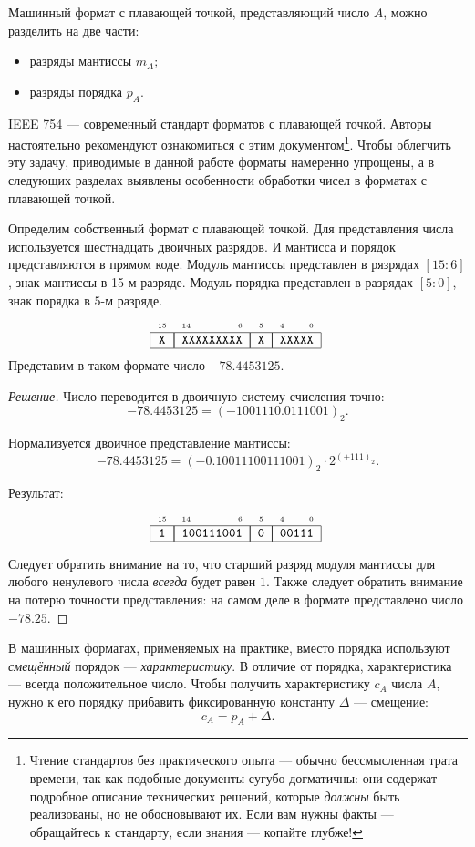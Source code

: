 Машинный формат с плавающей точкой, представляющий число $A$, можно разделить на две части:
\begin{itemize}
    \item разряды мантиссы $m_A$;
    \item разряды порядка $p_A$.
\end{itemize}

IEEE 754 --- современный стандарт форматов с плавающей точкой. Авторы настоятельно рекомендуют ознакомиться с этим документом\footnote{Чтение стандартов без практического опыта --- обычно бессмысленная трата времени, так как подобные документы сугубо догматичны: они содержат подробное описание технических решений, которые \emph{должны} быть реализованы, но не обосновывают их. Если вам нужны факты --- обращайтесь к стандарту, если знания --- копайте глубже!}. Чтобы облегчить эту задачу, приводимые в данной работе форматы намеренно упрощены, а в следующих разделах выявлены особенности обработки чисел в форматах с плавающей точкой.

\begin{Example}
    \label{ch:digitFormat:16order}
    Определим собственный формат с плавающей точкой. Для представления числа используется шестнадцать двоичных разрядов. И мантисса и порядок представляются в прямом коде. Модуль мантиссы представлен в рязрядах $[15:6]$, знак мантиссы в 15-м разряде. Модуль порядка представлен в разрядах $[5:0]$, знак порядка в $5$-м разряде.
    \[
        \FloatMyHex{X}{XXXXXXXXX}{X}{XXXXX}
    \]
    Представим в таком формате число $-78.4453125$.
\end{Example}
\begin{proof}[Решение]
    Число переводится в двоичную систему счисления точно:
    \[-78.4453125 = (-1001110.0111001)_2.\]
    
    Нормализуется двоичное представление мантиссы:
    \[-78.4453125 = (-0.10011100111001)_2\cdot 2^{(+111)_2}.\]
    
    Результат:
    \[
        \FloatMyHex{1}{100111001}{0}{00111}
    \]
    
    Следует обратить внимание на то, что старший разряд модуля мантиссы для любого ненулевого числа \emph{всегда} будет равен $1$. Также следует обратить внимание на потерю точности представления: на самом деле в формате представлено число $-78.25$.
\end{proof}

В машинных форматах, применяемых на практике, вместо порядка используют \emph{смещённый} порядок --- \emph{характеристику}. В отличие от порядка, характеристика --- всегда положительное число. Чтобы получить характеристику $c_A$ числа $A$, нужно к его порядку прибавить фиксированную константу $\Delta$ --- смещение:
\[
    c_A = p_A + \Delta.
\]

